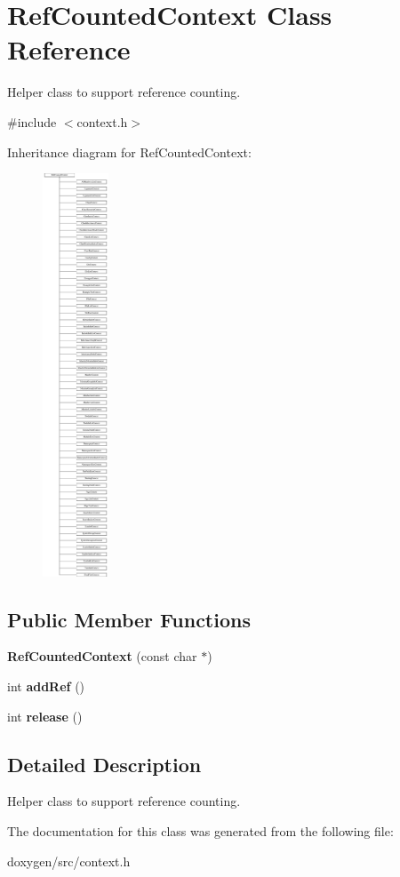 \hypertarget{class_ref_counted_context}{}\section{Ref\+Counted\+Context Class Reference}
\label{class_ref_counted_context}


Helper class to support reference counting.  




{\ttfamily \#include $<$context.\+h$>$}

Inheritance diagram for Ref\+Counted\+Context\+:\begin{figure}[H]
\begin{center}
\leavevmode
\includegraphics[height=12.000000cm]{class_ref_counted_context}
\end{center}
\end{figure}
\subsection*{Public Member Functions}
\begin{DoxyCompactItemize}
\item 
\mbox{\label{class_ref_counted_context_aef6fa38627d64e64a50c73786145e327}} 
{\bfseries Ref\+Counted\+Context} (const char $\ast$)
\item 
\mbox{\label{class_ref_counted_context_a12b3c6dbc5ed3c5907077f064b47dda5}} 
int {\bfseries add\+Ref} ()
\item 
\mbox{\label{class_ref_counted_context_a4d3c95432a22dc50de64bd2213405b22}} 
int {\bfseries release} ()
\end{DoxyCompactItemize}


\subsection{Detailed Description}
Helper class to support reference counting. 

The documentation for this class was generated from the following file\+:\begin{DoxyCompactItemize}
\item 
doxygen/src/context.\+h\end{DoxyCompactItemize}
